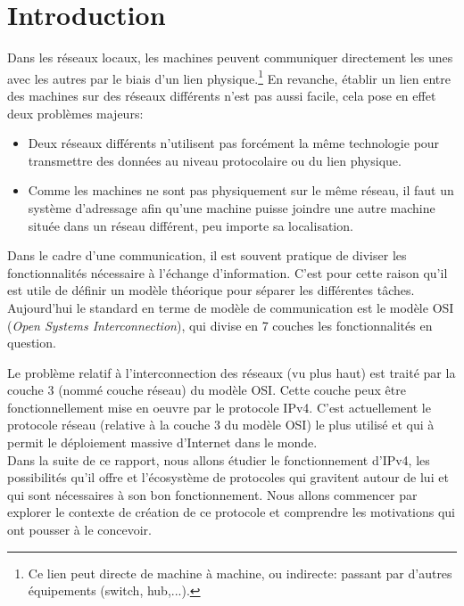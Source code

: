 \section{Introduction}
\label{sec:intro}

Dans les réseaux locaux, les machines peuvent communiquer directement les unes
avec les autres par le biais d'un lien physique.\footnote{Ce lien peut directe
de machine à machine, ou indirecte: passant par d'autres équipements (switch,
hub,...).} En revanche, établir un lien entre des machines sur des réseaux
différents n'est pas aussi facile, cela pose en effet deux problèmes majeurs:
\begin{itemize}
\item Deux réseaux différents n'utilisent pas forcément la même technologie
pour transmettre des données au niveau protocolaire ou du lien physique.
\item Comme les machines ne sont pas physiquement sur le même réseau, il faut
un système d'adressage afin qu'une machine puisse joindre une autre machine
située dans un réseau différent, peu importe sa localisation.
\end{itemize}
Dans le cadre d'une communication, il est souvent pratique de diviser les
fonctionnalités nécessaire à l'échange d'information. C'est pour cette raison qu'il est
utile de définir un modèle théorique pour séparer les différentes tâches.
Aujourd'hui le standard en terme de modèle de communication est le modèle OSI
({\it Open Systems Interconnection}), qui divise en 7 couches les
fonctionnalités en question.

\bigskip
Le problème relatif à l'interconnection des réseaux (vu plus haut) est traité
par la couche 3 (nommé couche réseau) du modèle OSI.
Cette couche peux être fonctionnellement mise en oeuvre par le protocole IPv4.
C'est actuellement le protocole réseau (relative à la couche 3 du modèle OSI)
le plus utilisé et qui à permit le déploiement massive d'Internet dans le
monde.\\
Dans la suite de ce rapport, nous allons étudier le fonctionnement d'IPv4, les
possibilités qu'il offre et l'écosystème de protocoles qui gravitent autour
de lui et qui sont nécessaires à son bon fonctionnement.  Nous allons commencer
par explorer le contexte de création de ce protocole et comprendre les
motivations qui ont pousser à le concevoir.


